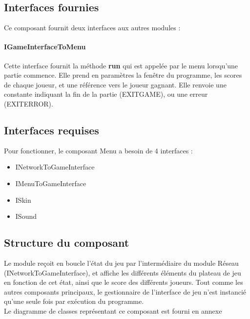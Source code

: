 \subsection{Interfaces fournies}

Ce composant fournit deux interfaces aux autres modules :

\paragraph{IGameInterfaceToMenu}

Cette interface fournit la méthode \textbf{run} qui est appelée par le menu lorsqu'une partie commence. Elle prend en paramètres la fenêtre du programme, les scores de chaque joueur, et une référence vers le joueur gagnant. Elle renvoie une constante indiquant la fin de la partie (EXITGAME), ou une erreur (EXITERROR).

\subsection{Interfaces requises}

Pour fonctionner, le composant Menu a besoin de 4 interfaces :
\begin{itemize}
    \item INetworkToGameInterface
    \item IMenuToGameInterface
    \item ISkin
    \item ISound    
\end{itemize}

\subsection{Structure du composant}

Le module reçoit en boucle l'état du jeu par l'intermédiaire du module Réseau (INetworkToGameInterface), et affiche les différents éléments du plateau de jeu en fonction de cet état, ainsi que le score des différents joueurs. Tout comme les autres composants principaux, le gestionnaire de l'interface de jeu n'est instancié qu'une seule fois par exécution du programme.\\

Le diagramme de classes représentant ce composant est fourni en annexe
